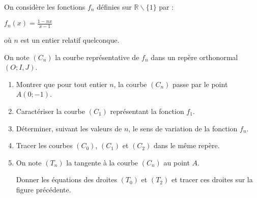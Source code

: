 
%
On considère les fonctions $f_n$ définies sur $\mathbb{R} \backslash \{1\}$ par :
\begin{center}$f_n(x)=\frac{1-nx}{x-1}$\end{center}
où $n$ est un entier relatif quelconque.
\par
On note $(C_n)$ la courbe représentative de $f_n$ dans un repère orthonormal $(O;I,J)$.
\begin{enumerate}
     \item
     Montrer que pour tout entier $n$, la courbe $(C_n)$ passe par le point $A(0;-1)$.
     \item
     Caractériser  la courbe $(C_{1})$ représentant la fonction $f_{1}$.
     \item
     Déterminer, suivant les valeurs de $n$, le sens de variation de la fonction $f_n$.
     \item
     Tracer les courbes $(C_{0})$, $(C_{1})$ et $(C_{2})$ dans le même repère.
     \item
     On note $(T_n)$ la tangente à la courbe $(C_{n})$ au point $A$.
     \par
     Donner les équations des droites $(T_{0})$ et $(T_{2})$ et tracer ces droites sur la figure précédente.
\end{enumerate}
